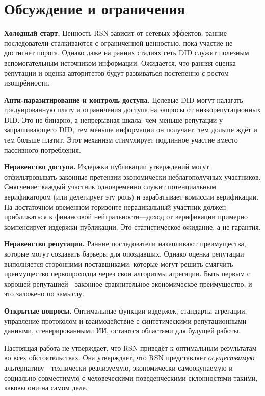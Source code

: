 \documentclass[11pt,a4paper,twocolumn]{article}
\begin{document}
\section{Обсуждение и ограничения}

\textbf{Холодный старт.} Ценность RSN зависит от сетевых эффектов; ранние последователи сталкиваются с ограниченной ценностью, пока участие не достигнет порога. Однако даже на ранних стадиях сеть DID служит полезным вспомогательным источником информации. Ожидается, что ранняя оценка репутации и оценка авторитетов будут развиваться постепенно с ростом изощрённости.

\textbf{Анти-паразитирование и контроль доступа.} Целевые DID могут налагать градуированную плату и ограничения доступа на запросы от низкорепутационных DID. Это не бинарно, а непрерывная шкала: чем меньше репутации у запрашивающего DID, тем меньше информации он получает, тем дольше ждёт и тем больше платит. Этот механизм стимулирует подлинное участие вместо пассивного потребления.

\textbf{Неравенство доступа.} Издержки публикации утверждений могут отфильтровывать законные претензии экономически неблагополучных участников. Смягчение: каждый участник одновременно служит потенциальным верификатором (или делегирует эту роль) и зарабатывает комиссии верификации. На достаточном временном горизонте нерадикальный участник должен приближаться к финансовой нейтральности---доход от верификации примерно компенсирует издержки публикации. Это статистическое ожидание, а не гарантия.

\textbf{Неравенство репутации.} Ранние последователи накапливают преимущества, которые могут создавать барьеры для опоздавших. Однако оценка репутации выполняется сторонними поставщиками, которые могут решить смягчить преимущество первопроходца через свои алгоритмы агрегации. Быть первым с хорошей репутацией---законное сравнительное экономическое преимущество, и это заложено по замыслу.

\textbf{Открытые вопросы.} Оптимальные функции издержек, стандарты агрегации, управление протоколом и взаимодействие с синтетическими репутационными данными, сгенерированными ИИ, остаются областями для будущей работы.

Настоящая работа не утверждает, что RSN приведёт к оптимальным результатам во всех обстоятельствах. Она утверждает, что RSN представляет \emph{осуществимую} альтернативу---технически реализуемую, экономически самоокупаемую и социально совместимую с человеческими поведенческими склонностями такими, каковы они на самом деле.
\end{document}
